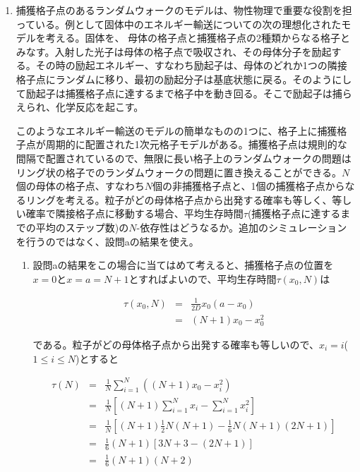 \documentclass{jsarticle}
\begin{document}
\begin{enumerate}
\begin{enumerate}
                \end{enumerate}

            \item  捕獲格子点のあるランダムウォークのモデルは、物性物理で重要な役割を担っている。例として固体中のエネルギー輸送についての次の理想化されたモデルを考える。固体を、 母体の格子点と捕獲格子点の2種類からなる格子とみなす。入射した光子は母体の格子点で吸収され、その母体分子を励起する。その時の励起エネルギー、すなわち励起子は、母体のどれか1つの隣接格子点にランダムに移り、最初の励起分子は基底状態に戻る。そのようにして励起子は捕獲格子点に達するまで格子中を動き回る。そこで励起子は捕らえられ、化学反応を起こす。

            このようなエネルギー輸送のモデルの簡単なものの1つに、格子上に捕獲格子点が周期的に配置された1次元格子モデルがある。捕獲格子点は規則的な間隔で配置されているので、無限に長い格子上のランダムウォークの問題はリング状の格子でのランダムウォークの問題に置き換えることができる。$N$個の母体の格子点、すなわち$N$個の非捕獲格子点と、1個の捕獲格子点からなるリングを考える。粒子がどの母体格子点から出発する確率も等しく、等しい確率で隣接格子点に移動する場合、平均生存時間$\tau$(捕獲格子点に達するまでの平均のステップ数)の$N$-依存性はどうなるか。追加のシミュレーションを行うのではなく、設問aの結果を使え。

                \begin{enumerate}
                    \item 設問aの結果をこの場合に当てはめて考えると、捕獲格子点の位置を$x=0$と$x=a=N+1$とすればよいので、平均生存時間$\tau(x_{0},N)$は

                    \begin{eqnarray*}
                        \tau(x_{0}, N) &=& \frac{1}{2D}x_{0}(a-x_{0}) \\
                        &=& (N+1)x_{0}-x_{0}^{2}
                    \end{eqnarray*}

                    である。粒子がどの母体格子点から出発する確率も等しいので、$x_{i}=i$($1 \le i \le N$)とすると

                    \begin{eqnarray*}
                        \tau(N) &=& \frac{1}{N}\sum_{i=1}^{N}\left( (N+1)x_{0}-x_{i}^{2}\right) \\
                        &=& \frac{1}{N}\left[ (N+1)\sum_{i=1}^{N}x_{i}-\sum_{i=1}^{N}x_{i}^{2}\right] \\
                        &=& \frac{1}{N}\left[ (N+1)\frac{1}{2}N(N+1)-\frac{1}{6}N(N+1)(2N+1)\right] \\
                        &=& \frac{1}{6}(N+1)\left[ 3N+3-(2N+1)\right] \\
                        &=& \frac{1}{6}(N+1)(N+2)
                    \end{eqnarray*}


\end{enumerate}
\end{enumerate}
\end{document}
